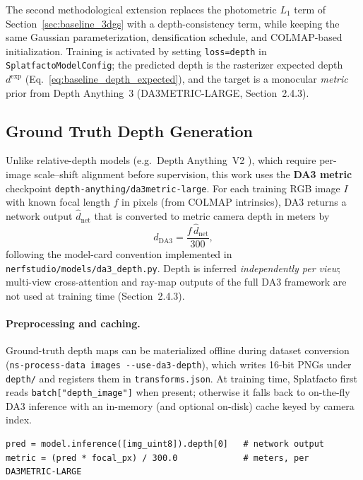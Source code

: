 \documentclass{report}
\newcommand{\filepath}[1]{\nolinkurl{#1}}
\newcommand{\codeid}[1]{\nolinkurl{#1}}
\newcommand{\code}[1]{\nolinkurl{#1}}
\begin{document}
The second methodological extension replaces the photometric $L_1$ term of Section~\ref{sec:baseline_3dgs} with a depth-consistency term, while keeping the same Gaussian parameterization, densification schedule, and COLMAP-based initialization. Training is activated by setting \texttt{loss=depth} in \texttt{SplatfactoModelConfig}; the predicted depth is the rasterizer expected depth $d^{\mathrm{exp}}$ (Eq.~\eqref{eq:baseline_depth_expected}), and the target is a monocular \emph{metric} prior from Depth Anything~3 (DA3METRIC-LARGE, Section~2.4.3).

\subsection{Ground Truth Depth Generation}
\label{subsec:da3_gt_depth}

Unlike relative-depth models (e.g.\ Depth Anything~V2 \cite{yang2024depthanythingv2}), which require per-image scale--shift alignment before supervision, this work uses the \textbf{DA3 metric} checkpoint \codeid{depth-anything/da3metric-large}. For each training RGB image $I$ with known focal length $f$ in pixels (from COLMAP intrinsics), DA3 returns a network output $\hat{d}_{\mathrm{net}}$ that is converted to metric camera depth in meters by
\begin{equation}
d_{\mathrm{DA3}} = \frac{f\,\hat{d}_{\mathrm{net}}}{300},
\label{eq:da3_metric}
\end{equation}
following the model-card convention implemented in \filepath{nerfstudio/models/da3\_depth.py}. Depth is inferred \emph{independently per view}; multi-view cross-attention and ray-map outputs of the full DA3 framework are not used at training time (Section~2.4.3).

\paragraph{Preprocessing and caching.}
Ground-truth depth maps can be materialized offline during dataset conversion (\code{ns-process-data images --use-da3-depth}), which writes 16-bit PNGs under \filepath{depth/} and registers them in \filepath{transforms.json}. At training time, Splatfacto first reads \code{batch["depth\_image"]} when present; otherwise it falls back to on-the-fly DA3 inference with an in-memory (and optional on-disk) cache keyed by camera index.

\begin{lstlisting}[caption={Metric conversion in \code{DA3MetricDepthEstimator.infer\_metric\_depth} (\filepath{da3\_depth.py}).},label={lst:da3_metric}]
pred = model.inference([img_uint8]).depth[0]   # network output
metric = (pred * focal_px) / 300.0             # meters, per DA3METRIC-LARGE
\end{lstlisting}
\end{document}
